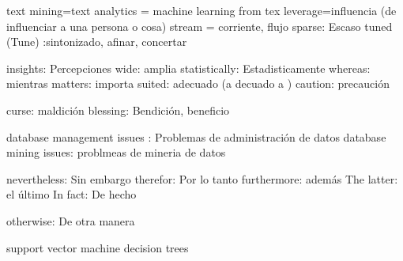 





text mining=text analytics = machine learning from tex
leverage=influencia (de influenciar a una persona o cosa)
stream = corriente, flujo
sparse: Escaso 
tuned (Tune) :sintonizado, afinar, concertar



insights: Percepciones
wide: amplia
statistically: Estadisticamente
whereas: mientras
matters: importa
suited: adecuado (a decuado a )
caution: precaución


curse: maldición
blessing: Bendición, beneficio

database management issues : Problemas de administración de datos
database mining issues: problmeas de mineria de datos


nevertheless: Sin embargo
therefor: Por lo tanto
furthermore: además
The latter: el último
In fact: De hecho



otherwise: De otra manera




support vector machine
decision trees 
